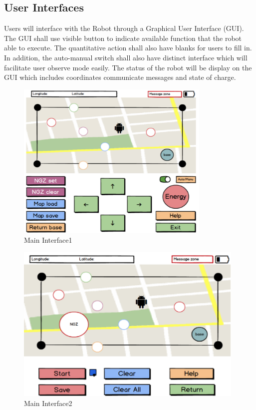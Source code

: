 \documentclass[11pt, a4paper]{article}
\begin{document}
\subsection{User Interfaces}
Users will interface with the Robot through a Graphical User Interface (GUI). The GUI shall use visible button to indicate available function that the robot able to execute. The quantitative action shall also have blanks for users to fill in. In addition, the auto-manual switch shall also have distinct interface which will facilitate user observe mode easily. The status of the robot will be display on the GUI which includes coordinates communicate messages and state of charge.

\begin{figure}[H]
\centering
\includegraphics[height=3in]{MainInterface1}
\caption[Main Interface]{Main Interface1}
\end{figure}

\begin{figure}[H]
\centering
\includegraphics[height=3in]{MainInterface2}
\caption[Main Interface]{Main Interface2}
\end{figure}
\end{document}
